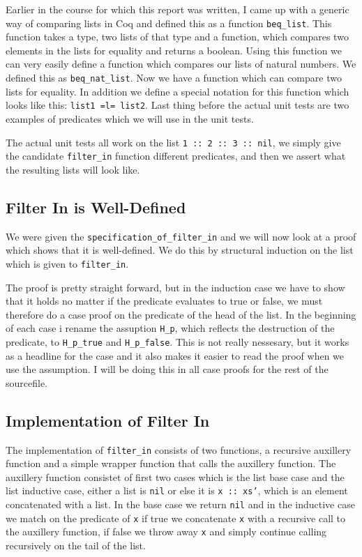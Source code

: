 \documentclass{article}
\begin{document}
Earlier in the course for which this report was written, I came up with a generic way of comparing lists in Coq and defined this as a function \texttt{beq\_list}. This function takes a type, two lists of that type and a function, which compares two elements in the lists for equality and returns a boolean. Using this function we can very easily define a function which compares our lists of natural numbers. We defined this as \texttt{beq\_nat\_list}. Now we have a function which can compare two lists for equality. In addition we define a special notation for this function which looks like this: \texttt{list1 =l= list2}. Last thing before the actual unit tests are two examples of predicates which we will use in the unit tests.

The actual unit tests all work on the list \texttt{1 :: 2 :: 3 :: nil}, we simply give the candidate \texttt{filter\_in} function different predicates, and then we assert what the resulting lists will look like.

\subsection{Filter In is Well-Defined}
We were given the \texttt{specification\_of\_filter\_in} and we will now look at a proof which shows that it is well-defined. We do this by structural induction on the list which is given to \texttt{filter\_in}. 

The proof is pretty straight forward, but in the induction case we have to show that it holds no matter if the predicate evaluates to true or false, we must therefore do a case proof on the predicate of the head of the list. In the beginning of each case i rename the assuption \texttt{H\_p}, which reflects the destruction of the predicate, to \texttt{H\_p\_true} and \texttt{H\_p\_false}. This is not really nessesary, but it works as a headline for the case and it also makes it easier to read the proof when we use the assumption. I will be doing this in all case proofs for the rest of the sourcefile.

\subsection{Implementation of Filter In}
The implementation of \texttt{filter\_in} consists of two functions, a recursive auxillery function and a simple wrapper function that calls the auxillery function. The auxillery function consistet of first two cases which is the list base case and the list inductive case, either a list is \texttt{nil} or else it is \texttt{x :: xs'}, which is an element concatenated with a list. In the base case we return \texttt{nil} and in the inductive case we match on the predicate of \texttt{x} if true we concatenate \texttt{x} with a recursive call to the auxillery function, if false we throw away \texttt{x} and simply continue calling recursively on the tail of the list.
\end{document}
